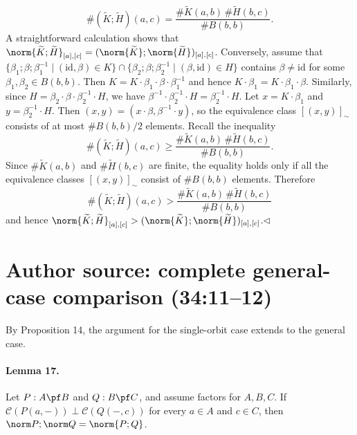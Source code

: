 \[
\#(\widetilde K;\widetilde H)(a,c)=
\frac{\#\widetilde K(a,b)\,\#\widetilde H(b,c)}{\#B(b,b)}.
\]
A straightforward calculation shows that $\norm{\widetilde K;\widetilde H}_{[a],[c]}=(\norm{\widetilde K};\norm{\widetilde H})_{[a],[c]}$.
Conversely, assume that $\{\beta_1;\beta;\beta_1^{-1}\mid(\mathrm{id},\beta)\in K\}\cap\{\beta_2;\beta;\beta_2^{-1}\mid(\beta,\mathrm{id})\in H\}$ contains $\beta\ne\mathrm{id}$ for some $\beta_1,\beta_2\in B(b,b)$. Then $K=K\cdot\beta_1\cdot\beta\cdot\beta_1^{-1}$ and hence $K\cdot\beta_1=K\cdot\beta_1\cdot\beta$. Similarly, since $H=\beta_2\cdot\beta\cdot\beta_2^{-1}\cdot H$, we have $\beta^{-1}\cdot\beta_2^{-1}\cdot H=\beta_2^{-1}\cdot H$. Let $x=K\cdot\beta_1$ and $y=\beta_2^{-1}\cdot H$. Then $(x,y)=(x\cdot\beta,\beta^{-1}\cdot y)$, so the equivalence class $[(x,y)]_\sim$ consists of at most $\#B(b,b)/2$ elements. Recall the inequality
\[
\#(\widetilde K;\widetilde H)(a,c)\ge
\frac{\#\widetilde K(a,b)\,\#\widetilde H(b,c)}{\#B(b,b)}.
\]
Since $\#\widetilde K(a,b)$ and $\#\widetilde H(b,c)$ are finite, the equality holds only if all the equivalence classes $[(x,y)]_\sim$ consist of $\#B(b,b)$ elements. Therefore
\[
\#(\widetilde K;\widetilde H)(a,c)>
\frac{\#\widetilde K(a,b)\,\#\widetilde H(b,c)}{\#B(b,b)}
\]
and hence $\norm{\widetilde K;\widetilde H}_{[a],[c]}>(\norm{\widetilde K};\norm{\widetilde H})_{[a],[c]}$.\hfill$\triangleleft$
\section*{Author source: complete general-case comparison (34:11--12)}
By Proposition 14, the argument for the single-orbit case extends to the general case.
\paragraph{Lemma 17.} Let $P:A\pf B$ and $Q:B\pf C$, and assume factors for $A,B,C$. If $\mathcal C(P(a,-))\perp\mathcal C(Q(-,c))$ for every $a\in A$ and $c\in C$, then $\norm P;\norm Q=\norm{P;Q}$.

